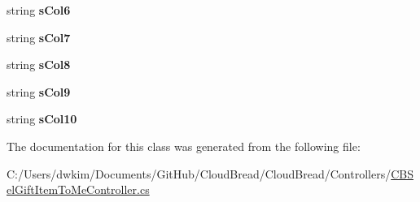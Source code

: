 \begin{DoxyCompactItemize}
\item 
string {\bfseries s\+Col6}\hypertarget{class_cloud_bread_1_1_controllers_1_1_c_b_sel_gift_item_to_me_controller_1_1_model_ad5f175acf2212865a052a3cd47dee7ce}{}\label{class_cloud_bread_1_1_controllers_1_1_c_b_sel_gift_item_to_me_controller_1_1_model_ad5f175acf2212865a052a3cd47dee7ce}

\item 
string {\bfseries s\+Col7}\hypertarget{class_cloud_bread_1_1_controllers_1_1_c_b_sel_gift_item_to_me_controller_1_1_model_a4141c4941120c18998840ba2bf007409}{}\label{class_cloud_bread_1_1_controllers_1_1_c_b_sel_gift_item_to_me_controller_1_1_model_a4141c4941120c18998840ba2bf007409}

\item 
string {\bfseries s\+Col8}\hypertarget{class_cloud_bread_1_1_controllers_1_1_c_b_sel_gift_item_to_me_controller_1_1_model_a4c2d93b1cb24504786e79c3e373a07a5}{}\label{class_cloud_bread_1_1_controllers_1_1_c_b_sel_gift_item_to_me_controller_1_1_model_a4c2d93b1cb24504786e79c3e373a07a5}

\item 
string {\bfseries s\+Col9}\hypertarget{class_cloud_bread_1_1_controllers_1_1_c_b_sel_gift_item_to_me_controller_1_1_model_af4c9648ec609b99ce2f199effde624b4}{}\label{class_cloud_bread_1_1_controllers_1_1_c_b_sel_gift_item_to_me_controller_1_1_model_af4c9648ec609b99ce2f199effde624b4}

\item 
string {\bfseries s\+Col10}\hypertarget{class_cloud_bread_1_1_controllers_1_1_c_b_sel_gift_item_to_me_controller_1_1_model_a14a94a772544dfc20d70b1abe19d8863}{}\label{class_cloud_bread_1_1_controllers_1_1_c_b_sel_gift_item_to_me_controller_1_1_model_a14a94a772544dfc20d70b1abe19d8863}

\end{DoxyCompactItemize}


The documentation for this class was generated from the following file\+:\begin{DoxyCompactItemize}
\item 
C\+:/\+Users/dwkim/\+Documents/\+Git\+Hub/\+Cloud\+Bread/\+Cloud\+Bread/\+Controllers/\hyperlink{_c_b_sel_gift_item_to_me_controller_8cs}{C\+B\+Sel\+Gift\+Item\+To\+Me\+Controller.\+cs}\end{DoxyCompactItemize}

